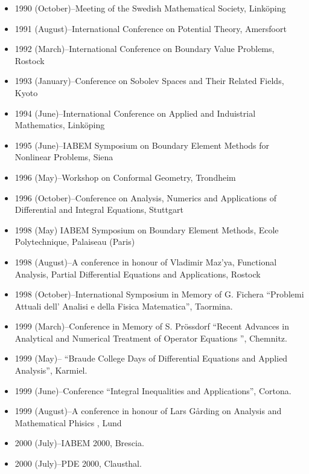 \documentclass{article}
\begin{document}
\begin{itemize}
         \item 1990 (October)--Meeting of the Swedish Mathematical
Society, Link\"oping
         \item 1991 (August)--International Conference on Potential
Theory, Amersfoort

         \item 1992 (March)--International Conference on Boundary
Value Problems, Rostock
          \item 1993 (January)--Conference on Sobolev Spaces and Their
Related Fields, Kyoto
         \item 1994 (June)--International Conference on Applied and
Induistrial Mathematics, Link\"oping
         \item 1995 (June)--IABEM Symposium on Boundary Element
Methods for Nonlinear Problems, Siena
          \item 1996 (May)--Workshop on Conformal Geometry, Trondheim
         \item 1996 (October)--Conference on Analysis, Numerics and
Applications of Differential and Integral Equations, Stuttgart
         \item 1998 (May) IABEM Symposium on Boundary Element Methods, Ecole
           Polytechnique, Palaiseau (Paris)
         \item 1998 (August)--A conference in honour of Vladimir Maz'ya,
           Functional Analysis, Partial Differential Equations and
           Applications, Rostock
         \item 1998 (October)--International Symposium in Memory of G.
Fichera ``Problemi Attuali dell' Analisi e della Fisica
               Matematica'', Taormina.
         \item 1999 (March)--Conference in Memory of S. Pr\"ossdorf
``Recent Advances in Analytical and Numerical Treatment of
               Operator Equations '', Chemnitz.
         \item 1999 (May)-- ``Braude College Days of Differential
Equations and Applied Analysis'', Karmiel.
         \item 1999 (June)--Conference ``Integral Inequalities and
Applications'', Cortona.
         \item 1999 (August)--A conference in honour of Lars
G{\aa}rding on Analysis and Mathematical Phisics , Lund
         \item 2000 (July)--IABEM 2000, Brescia.
         \item 2000 (July)--PDE 2000, Clausthal.

\end{itemize}
\end{document}
